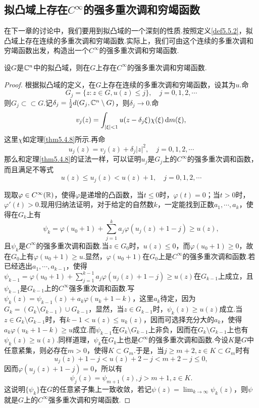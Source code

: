 \subsection{拟凸域上存在$C^\infty$的强多重次调和穷竭函数}
在下一章的讨论中，我们要用到拟凸域的一个深刻的性质.按照定义\ref{def5.5.2}，拟凸域上存在连续的多重次调和穷竭函数.实际上，我们可由这个连续的多重次调和穷竭函数出发，构造出一个$C^\infty$的强多重次调和穷竭函数.
\begin{theorem}\label{thm5.5.10}
	设$G$是$\mathbb C^n$中的拟凸域，则在$G$上存在$C^\infty$的强多重次调和穷竭函数.
\end{theorem}
\begin{proof}
	根据拟凸域的定义，在$G$上存在连续的多重次调和穷竭函数，设其为$u$.命
	\[G_j=\{z\colon z\in G,u(z)\le j\},\quad j=0,1,2,\cdots\]
	则$G_j\subset\subset G$.记$\delta_j=\frac12 d(G_j,\mathbb C^n\setminus G)$，则$\delta_j\to0$.命
	\[v_j(z)=\int_{|\xi|<1}u(z-\delta_j\xi)\chi(\xi)\mathop{}\!\mathrm{d} m(\xi),\]
	这里$\chi$如定理\ref{thm5.4.8}所示.再命
	\[u_j(z)=v_j(z)+\delta_j |z|^2,\quad j=0,1,2,\cdots\]
	那么和定理\ref{thm5.4.8}的证法一样，可以证明$u_j$是$G_j$上的$C^\infty$的强多重次调和函数，而且满足不等式
	\[u(z)\le u_j(z)< u(z)+1,\quad j=0,1,2,\cdots\]
	
	现取$\varphi\in C^\infty(\mathbb R)$，使得$\varphi$是递增的凸函数，当$t\le0$时，$\varphi(t)=0$；当$t>0$时，$\varphi'(t)>0$.现用归纳法证明，对于给定的自然数$k$，一定能找到正数$a_1,\cdots,a_k$，使得在$G_k$上有
	\[\psi_k=\varphi(u_0+1)+\sum_{j=1}^{k}a_j\varphi(u_j(z)+1-j)\ge u(z),\]
	且$\psi_k$是$C^\infty$的强多重次调和函数.当$z\in G_0$时，$u(z)\le0$，而$\varphi(u_0+1)\ge0$，故在$G_0$上有$\varphi(u_0+1)\ge u$.显然，$\varphi(u_0+1)$在$G_0$上是$C^\infty$的强多重次调和函数.若已经选出$a_1,\cdots,a_{k-1}$，使得$\psi_{k-1}=\varphi(u_0+1)+\sum_{j=1}^{k-1}a_j\varphi(u_j(z)+1-j)\ge u(z)$在$G_{k-1}$上成立，且$\psi_{k-1}$是$G_{k-1}$上的$C^\infty$强多重次调和函数.写$\psi_k(z)=\psi_{k-1}(z)+a_k\varphi(u_k+1-k)$，这里$a_k$待定，因为$G_k=(G_k\setminus G_{k-1})\cup G_{k-1}$，显然，当$z\in G_{k-1}$时，$\psi_k(z)\ge u(z)$成立.当$z\in G_k\setminus G_{k-1}$时，有$k-1<u(z)\le u_k(z)$，因而可选择充分大的$a_k$，使得$a_k\varphi(u_k+1-k)\ge u$成立.而$\psi_{k-1}$在$G_k\setminus G_{k-1}$上非负，因而在$G_k\setminus G_{k-1}$上也有$\psi_k(z)\ge u(z)$.同样道理，$\psi_k$在$G_k$上也是$C^\infty$的强多重次调和函数.今设$K$是$G$中任意紧集，则必存在$m>0$，使得$K\subset G_m$.于是，当$j\ge m+2,z\in K\subset G_m$时有
	\[u_j(z)+1-j<u(z)+2-j<m+2-j\le0,\]
	因而$\varphi(u_j(z)+1-j)=0$，所以有
	\[\psi_j(z)=\psi_{m+1}(z),j>m+1,z\in K.\]
	这说明$\{\psi_k\}$在$G$的任意紧子集上一致收敛，若记$\psi(z)=\lim_{k\to\infty}\psi_k(z)$，则$\psi$就是$G$上的$C^\infty$强多重次调和穷竭函数.
\end{proof}
